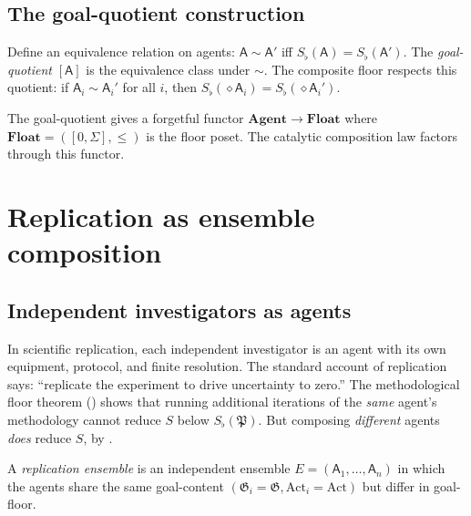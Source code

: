 \documentclass[11pt,a4paper]{article}
\newcommand{\Method}{\mathfrak{P}}
\newcommand{\Goal}{\mathfrak{G}}
\newcommand{\agent}{\mathsf{A}}
\newcommand{\Sfloor}{S_{\flat}}
\newcommand{\Action}{\mathrm{Act}}
\newcommand{\Compose}{\diamond}
\begin{document}
\subsection{The goal-quotient construction}

\begin{construction}\label{con:goal-quot}
Define an equivalence relation on agents: $\agent\sim\agent'$ iff
$\Sfloor(\agent)=\Sfloor(\agent')$. The \emph{goal-quotient}
$[\agent]$ is the equivalence class under $\sim$. The composite floor
respects this quotient: if $\agent_i\sim\agent_i'$ for all $i$, then
$\Sfloor(\Compose\agent_i)=\Sfloor(\Compose\agent_i')$.
\end{construction}

\begin{remark}\label{rem:cat-quot}
The goal-quotient gives a forgetful functor
$\mathbf{Agent}\to\mathbf{Float}$ where $\mathbf{Float}=([0,\Sigma],\le)$
is the floor poset. The catalytic composition law factors through
this functor.
\end{remark}

\section{Replication as ensemble composition}
\label{sec:replication}

\subsection{Independent investigators as agents}

In scientific replication, each independent investigator is an agent
with its own equipment, protocol, and finite resolution. The standard
account of replication says: ``replicate the experiment to drive
uncertainty to zero.'' The methodological floor theorem
() shows that running additional iterations of the
\emph{same} agent's methodology cannot reduce $S$ below
$\Sfloor(\Method)$. But composing \emph{different} agents
\emph{does} reduce $S$, by .

\begin{definition}\label{def:rep-ens}
A \emph{replication ensemble} is an independent ensemble
$E=(\agent_1,\dots,\agent_n)$ in which the agents share the same
goal-content $(\Goal_i=\Goal,\Action_i=\Action)$ but differ in
goal-floor.
\end{definition}
\end{document}
